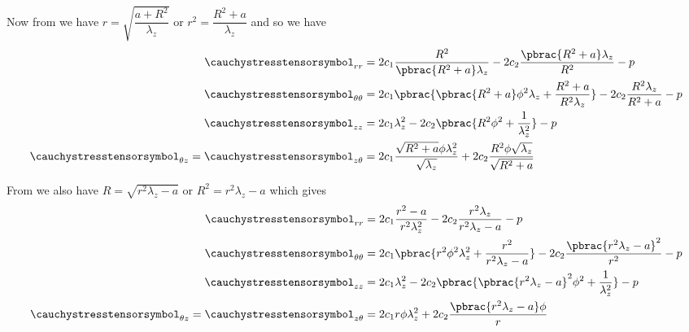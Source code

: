 Now from  we have $r=\sqrt{\dfrac{a+R^{2}}{\lambda_{z}}}$ or $r^{2}=\dfrac{R^{2}+a}{\lambda_{z}}$ and so we have
\begin{equation}
  \begin{split} 
    \cauchystresstensorsymbol_{rr}&=2c_{1}\dfrac{R^{2}}{\pbrac{R^{2}+a}\lambda_{z}}-2c_{2}\dfrac{\pbrac{R^{2}+a}\lambda_{z}}{R^{2}} - p\\
    \cauchystresstensorsymbol_{\theta\theta}&=2c_{1}\pbrac{\pbrac{R^{2}+a}\phi^{2}\lambda_{z}+\dfrac{R^{2}+a}{R^{2}\lambda_{z}}}
    -2c_{2}\dfrac{R^{2}\lambda_{z}}{R^{2}+a}-p \\
    \cauchystresstensorsymbol_{zz}&=2c_{1}\lambda_{z}^{2}-2c_{2}\pbrac{R^{2}\phi^{2}+\dfrac{1}{\lambda_{z}^{2}}} -p \\
    \cauchystresstensorsymbol_{\theta z}=\cauchystresstensorsymbol_{z \theta}&= 2c_{1}\dfrac{\sqrt{R^{2}+a}\phi\lambda_{z}^{2}}{\sqrt{\lambda_{z}}}+2c_{2}\dfrac{R^{2}\phi\sqrt{\lambda_{z}}}{\sqrt{R^{2}+a}}
  \end{split}
  \label{eqn:FEAnalyticTubeStressComponentsR}
\end{equation}

From  we also have $R=\sqrt{r^{2}\lambda_{z}-a}$ or $R^{2}=r^{2}\lambda_{z}-a$ which gives
\begin{equation}
  \begin{split} 
    \cauchystresstensorsymbol_{rr}&= 2c_{1}\dfrac{r^{2}-a}{r^{2}\lambda_{z}^{2}}-2c_{2}\dfrac{r^{2}\lambda_{z}}{r^{2}\lambda_{z}-a} - p\\
    \cauchystresstensorsymbol_{\theta\theta} &=2c_{1}\pbrac{r^{2}\phi^{2}\lambda_{z}^{2}+\dfrac{r^{2}}{r^{2}\lambda_{z}-a}}-2c_{2}\dfrac{\pbrac{r^{2}\lambda_{z}-a}^{2}}{r^{2}}-p \\
    \cauchystresstensorsymbol_{zz}&=2c_{1}\lambda_{z}^{2}-2c_{2}\pbrac{\pbrac{r^{2}\lambda_{z}-a}^{2}\phi^{2}+\dfrac{1}{\lambda_{z}^{2}}} -p \\
    \cauchystresstensorsymbol_{\theta z}=\cauchystresstensorsymbol_{z \theta}&= 2c_{1}r\phi\lambda_{z}^{2}+2c_{2}\dfrac{\pbrac{r^{2}\lambda_{z}-a}\phi}{r}
  \end{split}
  \label{eqn:FEAnalyticTubeStressComponentsr}
\end{equation}


